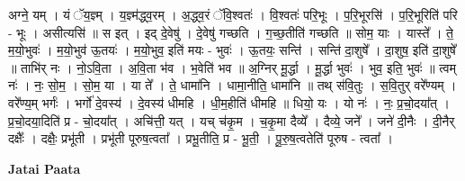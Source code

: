 \documentclass[17pt]{extarticle}
\begin{document}
अग्ने॒ यम् । यं ॅय॒ज्ञ्म् । य॒ज्ञ्म॑द्ध्व॒रम् । अ॒द्ध्व॒रं ॅवि॒श्वतः॑ । वि॒श्वतः॑ परि॒भूः । प॒रि॒भूरसि॑ । प॒रि॒भूरिति॑ परि - भूः । असीत्यसि॑ ॥ स इत् । इद् दे॒वेषु॑ । दे॒वेषु॑ गच्छति । ग॒च्छ॒तीति॑ गच्छति ॥ सोम॒ याः । यास्ते᳚ । ते॒ म॒यो॒भुवः॑ । म॒यो॒भुव॑ ऊ॒तयः॑ । म॒यो॒भुव॒ इति॑ मयः - भुवः॑ । ऊ॒तयः॒ सन्ति॑ । सन्ति॑ दा॒शुषे᳚ । दा॒शुष॒ इति॑ दा॒शुषे᳚ ॥ ताभि॑र् नः । नो॒ऽवि॒ता । अ॒वि॒ता भ॑व । भ॒वेति॑ भव ॥ अ॒ग्निर् मू॒र्द्धा । मू॒र्द्धा भुवः॑ । भुव॒ इति॒ भुवः॑ ॥ त्वम् नः॑ । नः॒ सो॒म॒ । सो॒म॒ या । या ते᳚ । ते॒ धामा॑नि । धामा॒नीति॒ धामा॑नि ॥ तथ् स॑वि॒तुः । स॒वि॒तुर् वरे᳚ण्यम् । वरे᳚ण्य॒म् भर्गः॑ । भर्गो॑ दे॒वस्य॑ । दे॒वस्य॑ धीमहि । धी॒म॒हीति॑ धीमहि ॥ धियो॒ यः । यो नः॑ । नः॒ प्र॒चो॒दया᳚त् । प्र॒चो॒दया॒दिति॑ प्र - चो॒दया᳚त् । अचि॑त्ती॒ यत् । यच् च॑कृ॒म । च॒कृ॒मा दैव्ये᳚ । दैव्ये॒ जने᳚ । जने॑ दी॒नैः । दी॒नैर् दक्षैः᳚ । दक्षैः॒ प्रभू॑ती । प्रभू॑ती पूरुष॒त्वता᳚ । प्रभू॒तीति॒ प्र - भू॒ती॒ । पू॒रु॒ष॒त्वतेति॑ पूरुष - त्वता᳚ । \newline

\textbf{Jatai Paata} \newline
\end{document}
